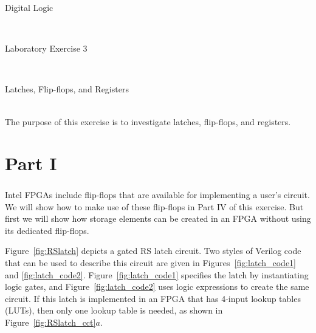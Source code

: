 \documentclass[epsfig,10pt,fullpage]{article}
\newcommand{\LabNum}{3}
\begin{document}
\centerline{\huge Digital Logic}
~\\
\centerline{\huge Laboratory Exercise \LabNum}
~\\
\centerline{\large Latches, Flip-flops, and Registers}
~\\

\noindent
The purpose of this exercise is to investigate latches, flip-flops, and registers.

\section*{Part I}
Intel\textsuperscript{\textregistered} FPGAs include flip-flops that are available for implementing a user's circuit. 
We will show how to make use of these flip-flops in Part IV of this exercise. But
first we will show how storage elements can be created in an FPGA without using 
its dedicated flip-flops.

Figure~\ref{fig:RSlatch} depicts a gated RS latch circuit. Two styles of Verilog code
that can be used to describe this circuit are given in Figures~\ref{fig:latch_code1}
and \ref{fig:latch_code2}.
Figure~\ref{fig:latch_code1} specifies the latch by instantiating logic gates, and 
Figure~\ref{fig:latch_code2} uses 
logic expressions to create the same circuit. If this latch is implemented
in an FPGA that has 4-input lookup tables (LUTs), then only one lookup table is needed, 
as shown in Figure~\ref{fig:RSlatch_cct}$a$. 
\end{document}
